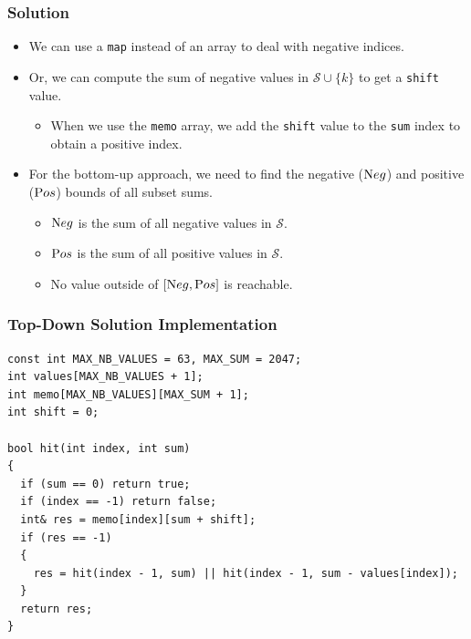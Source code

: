 \documentclass{beamer}
\begin{document}
\begin{frame}%
\frametitle{Solution}

\begin{itemize}

\item We can use a \texttt{map} instead of an array to deal with negative indices.

\vspace{0.2cm}

\item<2-> Or, we can compute the sum of negative values
in $\mathcal{S} \cup \{k\}$ to get a \texttt{shift} value.
\begin{itemize}
\vspace{0.05cm}
\item<2-> When we use the \texttt{memo} array, we add the \texttt{shift} value to the \texttt{sum} index to obtain a positive index.

\end{itemize}

\vspace{0.2cm}

\item<3-> For the bottom-up approach, we need to find the negative (${\textrm Neg}$) and positive (${\textrm Pos}$) bounds of all subset sums.
\begin{itemize}
\vspace{0.05cm}
\item<3-> ${\textrm Neg}$ is the sum of all negative values in $\mathcal{S}$.
\vspace{0.1cm}
\item<3-> ${\textrm Pos}$ is the sum of all positive values in $\mathcal{S}$.
\vspace{0.1cm}
\item<3-> No value outside of $[{\textrm Neg}, {\textrm Pos}]$ is reachable.
\end{itemize}

\end{itemize}

\end{frame}

\begin{frame}[containsverbatim]
\frametitle{Top-Down Solution Implementation}

\scriptsize
\begin{lstlisting}
const int MAX_NB_VALUES = 63, MAX_SUM = 2047;
int values[MAX_NB_VALUES + 1];
int memo[MAX_NB_VALUES][MAX_SUM + 1];
int shift = 0;

bool hit(int index, int sum)
{
  if (sum == 0) return true;
  if (index == -1) return false;
  int& res = memo[index][sum + shift];
  if (res == -1)
  {
    res = hit(index - 1, sum) || hit(index - 1, sum - values[index]);
  }
  return res;
}
\end{lstlisting}

\end{frame}
\end{document}
